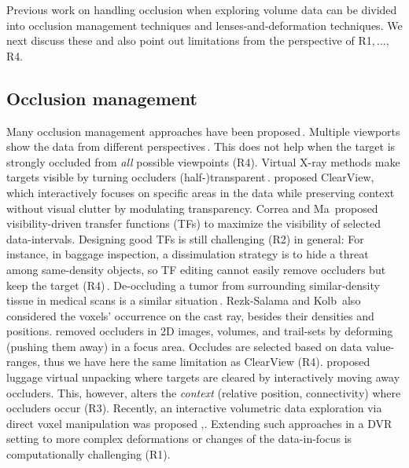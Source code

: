 Previous work on handling occlusion when exploring volume data can be divided into occlusion management techniques and lenses-and-deformation techniques. We next discuss these and also point out limitations from the perspective of R1$,\ldots,$R4.

\subsection{Occlusion management}
%
Many occlusion management approaches have been proposed\,\cite{4483791}. Multiple viewports show the data from different perspectives\,\cite{WangBaldonado:2000:GUM:345513.345271}. This does not help when the target is strongly occluded from \emph{all} possible viewpoints (R4). Virtual X-ray methods make targets visible by turning occluders (half-)transparent\,\cite{Burns:2008:ACC:1457515.1409107}.\cite{4015450} proposed ClearView, which interactively focuses on specific areas in the data while preserving context without visual clutter by modulating transparency. Correa and Ma\,\cite{5416704} proposed visibility-driven transfer functions (TFs) to maximize the visibility of selected data-intervals. Designing good TFs is still challenging (R2) in general: For instance, in baggage inspection, a dissimulation strategy is to hide a threat among same-density objects, so TF editing cannot easily remove occluders but keep the target (R4)\,\cite{7819413}. De-occluding a tumor from surrounding similar-density tissue in medical scans is a similar situation\,\cite{CGF:CGF12927}. 
Rezk-Salama and Kolb\,\cite{CGF:CGF979} also considered the voxels' occurrence on the cast ray, besides their densities and positions.\cite{6787171} removed occluders in 2D images, volumes, and trail-sets by deforming (pushing them away) in a focus area. Occludes are selected based on data value-ranges, thus we have here the same limitation as ClearView (R4). \cite{Li:2012:LVV:2425296.2425325} proposed luggage virtual unpacking where targets are cleared by interactively moving away occluders. This, however, alters the \emph{context} (relative position, connectivity) where occluders occur (R3). Recently, an interactive volumetric data exploration via direct voxel manipulation was proposed ,\cite{7819413}. Extending such approaches in a DVR setting to more complex deformations or changes of the data-in-focus is computationally challenging (R1).


